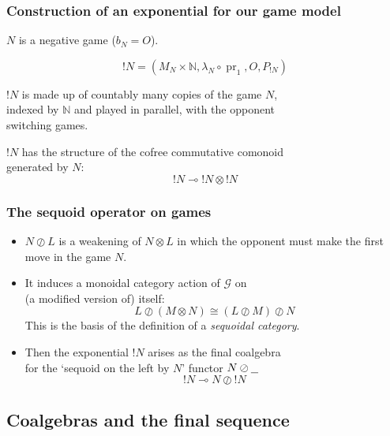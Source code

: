\documentclass{beamer}
\DeclareMathOperator{\pr}{pr}
\newcommand{\tensor}{\otimes}
\newcommand{\sequoid}{\oslash}
\renewcommand{\implies}{\multimap}
\newcommand{\G}{\mathcal G}
\newcommand{\nsb}{N\sequoid\underline{\hspace{1.5ex}}\;}
\begin{document}
\begin{frame}
  \frametitle{Construction of an exponential for our game model}

  $N$ is a negative game ($b_N=O$).

  \[
    !N=(M_N\times\mathbb N,\lambda_N\circ\pr_1,O,P_{!N})
    \]

  $!N$ is made up of countably many copies of the game $N$,\\
  indexed by $\mathbb N$ and played in parallel, with the opponent\\
  switching games.  

  $!N$ has the structure of the cofree commutative comonoid\\
  generated by $N$:
  \[
    !N\implies !N\tensor !N
    \]

\end{frame}

\begin{frame}
  \frametitle{The sequoid operator on games}

  \begin{itemize}
    \item $N\sequoid L$ is a weakening of $N\tensor L$ in which the opponent must make the first move in the game $N$.
    \item It induces a monoidal category action of $\G$ on \\
      (a modified version of) itself:
      \[
        L \sequoid (M \tensor N) \cong (L \sequoid M) \sequoid N
        \]
      This is the basis of the definition of a \emph{sequoidal category}.
    \item Then the exponential $!N$ arises as the final coalgebra \\
      for the `sequoid on the left by $N$' functor $\nsb$
      \[
        !N\implies N\sequoid !N
        \]
  \end{itemize}

\end{frame}

\subsection{Coalgebras and the final sequence}
\end{document}

